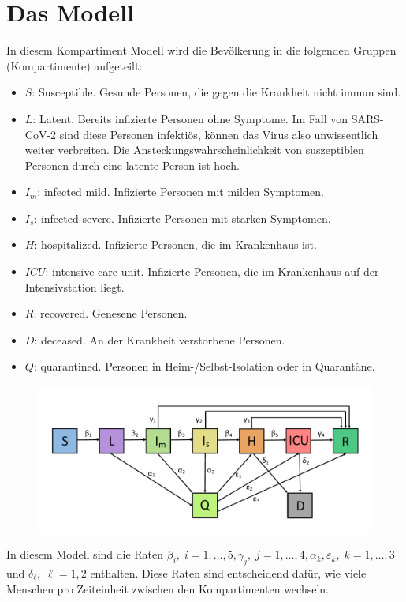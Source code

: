\documentclass[twoside]{article}
\begin{document}
\section{Das Modell}\label{sec:modell}
%
In diesem Kompartiment Modell wird die Bev\"olkerung in die folgenden Gruppen (Kompartimente) aufgeteilt:\\
\begin{itemize}
\item $S$: Susceptible. Gesunde Personen, die gegen die Krankheit nicht immun sind.
\item $L$: Latent. Bereits infizierte Personen ohne Symptome. Im Fall von SARS-CoV-2 sind diese Personen infekti\"os, k\"onnen das Virus also unwissentlich weiter verbreiten. Die Ansteckungswahrscheinlichkeit von suszeptiblen Personen durch eine latente Person ist hoch.
\item $I_m$: infected mild. Infizierte Personen mit milden Symptomen.
\item $I_s$: infected severe. Infizierte Personen mit starken Symptomen.
\item $H$: hospitalized. Infizierte Personen, die im Krankenhaus ist.
\item $ICU$: intensive care unit. Infizierte Personen, die im Krankenhaus auf der Intensivstation liegt.
\item $R$: recovered. Genesene Personen.
\item $D$: deceased. An der Krankheit verstorbene Personen.
\item $Q$: quarantined. Personen in Heim-/Selbst-Isolation oder in  Quarant\"ane.
\end{itemize}
%
\begin{figure}[h!]
	\centering
	\includegraphics[width=\textwidth]{./flowchart.pdf}
\end{figure}
%
In diesem Modell sind die Raten $\beta_i,\;i=1,\ldots,5, \gamma_j,\;j=1,\ldots,4,
\alpha_k, \varepsilon_k, \;k=1,\ldots,3$ und $\delta_\ell,\;\ell=1,2$ enthalten. Diese Raten sind entscheidend daf\"ur, wie viele Menschen pro Zeiteinheit zwischen den Kompartimenten wechseln.
\end{document}
